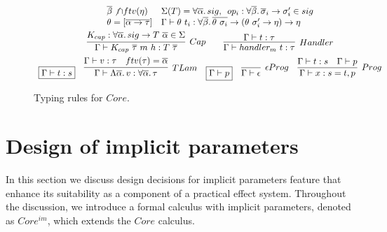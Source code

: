 \documentclass[acmsmall]{acmart}
\newcommand{\mathframebox}[1]{\framebox{$\displaystyle #1$}}
\newcommand{\ap}{~}
\begin{document}
\begin{figure}
\begin{gather*}
{            \begin{array}{ll}
                \overline{\beta}\not\cap ftv(\eta) & %
                \Sigma(T) = \forall\overline{\alpha}\ldotp sig, \hspace{0.5em} op_i : \forall\overline{\beta}\ldotp \overline{\sigma}_i\to\sigma'_i \in sig
                \\
                \theta = [\overline{\alpha\to\tau}] &
                \Gamma\vdash\theta\ap t_i : \forall \overline{\beta}\ldotp \overline{\theta\ap\sigma_i}\to(\theta\ap\sigma_i'\to\eta)\to\eta
            \end{array}
        }\\
        \infer[Cap]{
            \Gamma\vdash K_{cap}\ap\overline{\tau}\ap m\ap h : T\ap\overline{\tau}
        }{
            K_{cap} : \forall\overline{\alpha}\ldotp sig\to T\ap\overline{\alpha} \in \Sigma
        } %
        \hspace{2em}
        \infer[Handler]{
            \Gamma\vdash handler_m ~t : \tau
        }{
            \Gamma\vdash t : \tau
        }\\
        \begin{array}{ccccc}
            \mathframebox{\Gamma\vdash t : s} &
            \infer[TLam]{
                \Gamma\vdash\Lambda\overline{\alpha}\ldotp v : \forall\overline{\alpha}\ldotp\tau
            }{
                \Gamma\vdash v : \tau & ftv(\tau) = \overline{\alpha}
            } &
            \mathframebox{\Gamma\vdash p} &
            \infer[\epsilon Prog]{\Gamma\vdash\epsilon}{} &
            \infer[Prog]{\Gamma\vdash x : s = t, p}{\Gamma\vdash t : s & \Gamma\vdash p}
        \end{array}
    \end{gather*}
    \caption{Typing rules for $Core$.}
    \label{fig:core-typing}
\end{figure}


\section{Design of implicit parameters} \label{sec:implicits} %

In this section we discuss design decisions for implicit parameters feature that enhance its suitability as a component of a practical effect system.
Throughout the discussion, we introduce a formal calculus with implicit parameters, denoted as $Core^{im}$, which extends the $Core$ calculus.
\end{document}
